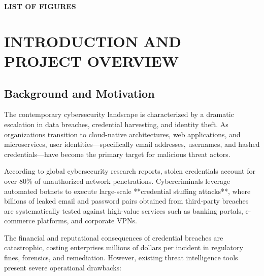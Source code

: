 \documentclass[12pt,a4paper,oneside]{report}
\begin{document}
\cleardoublepage
{}
\begin{center}
  \Large\bfseries LIST OF FIGURES
\end{center}
\vspace{1cm}
\listoffigures
\clearpage

\cleardoublepage
{}
\setcounter{page}{1}

\chapter{INTRODUCTION AND PROJECT OVERVIEW}

\section{Background and Motivation}

The contemporary cybersecurity landscape is characterized by a dramatic escalation in data breaches, credential harvesting, and identity theft. As organizations transition to cloud-native architectures, web applications, and microservices, user identities—specifically email addresses, usernames, and hashed credentials—have become the primary target for malicious threat actors.

According to global cybersecurity research reports, stolen credentials account for over 80\% of unauthorized network penetrations. Cybercriminals leverage automated botnets to execute large-scale **credential stuffing attacks**, where billions of leaked email and password pairs obtained from third-party breaches are systematically tested against high-value services such as banking portals, e-commerce platforms, and corporate VPNs.

The financial and reputational consequences of credential breaches are catastrophic, costing enterprises millions of dollars per incident in regulatory fines, forensics, and remediation. However, existing threat intelligence tools present severe operational drawbacks:
\end{document}
